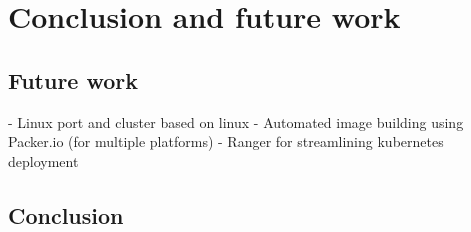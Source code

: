 \chapter{Conclusion and future work} %

\label{chap:conclusion} %




\section{Future work}
- Linux  port and cluster based on linux
- Automated image building using Packer.io (for multiple platforms)
- Ranger for streamlining kubernetes deployment




\section{Conclusion}